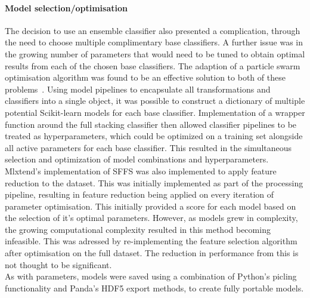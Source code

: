 \documentclass[titlepage, 12pt]{scrartcl} \usepackage{enumitem}
\begin{document}
\paragraph{Model selection/optimisation}\label{ModOp}
The decision to use an ensemble classifier also presented a complication,
through the need to choose multiple complimentary base classifiers. A further
issue was in the growing number of parameters that would need to be tuned to
obtain optimal results from each of the chosen base classifiers. The adaption
of a particle swarm optimisation algorithm was found to be an effective
solution to both of these problems~\parencite{Claesen2014}. Using model
pipelines to encapsulate all transformations and classifiers into a single
object, it was possible to construct a dictionary of multiple potential
Scikit-learn models for each base classifier.  Implementation of a wrapper
function around the full stacking classifier then allowed classifier pipelines
to be treated as hyperparameters, which could be optimized on a training set
alongside all active parameters for each base classifier. This resulted in the
simultaneous selection and optimization of model combinations and
hyperparameters.\\

Mlxtend's implementation of SFFS was also implemented to apply feature reduction to
the dataset. This was initially implemented as part of the processing pipeline,
resulting in feature reduction being applied on every iteration of parameter
optimisation. This initially provided a score for each model based on the
selection of it's optimal parameters. However, as models grew in complexity,
the growing computational complexity resulted in this method becoming infeasible.
This was adressed by re-implementing the feature selection algorithm after
optimisation on the full dataset. The reduction in performance from this is not
thought to be significant.\\

As with parameters, models were saved using a combination of Python's picling
functionality and Panda's HDF5 export methods, to create fully portable models.
\end{document}
